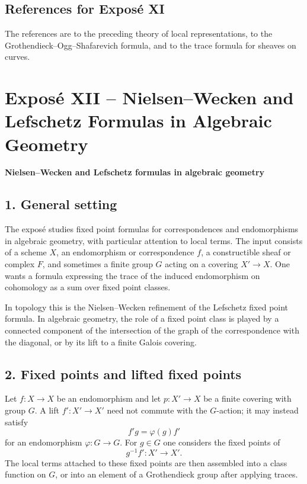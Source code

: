 \documentclass[11pt]{article}
\theoremstyle{plain}
\theoremstyle{definition}
\theoremstyle{remark}
\begin{document}
\subsection*{References for Expos\'e XI}

The references are to the preceding theory of local representations, to the Grothendieck--Ogg--Shafarevich formula, and to the trace formula for sheaves on curves.

\newpage

\section*{Expos\'e XII -- Nielsen--Wecken and Lefschetz Formulas in Algebraic Geometry}

\begin{center}
\textbf{Nielsen--Wecken and Lefschetz formulas in algebraic geometry}
\end{center}

\subsection*{1. General setting}

The expos\'e studies fixed point formulas for correspondences and endomorphisms in algebraic geometry, with particular attention to local terms. The input consists of a scheme $X$, an endomorphism or correspondence $f$, a constructible sheaf or complex $F$, and sometimes a finite group $G$ acting on a covering $X'\to X$. One wants a formula expressing the trace of the induced endomorphism on cohomology as a sum over fixed point classes.

In topology this is the Nielsen--Wecken refinement of the Lefschetz fixed point formula. In algebraic geometry, the role of a fixed point class is played by a connected component of the intersection of the graph of the correspondence with the diagonal, or by its lift to a finite Galois covering.

\subsection*{2. Fixed points and lifted fixed points}

Let $f:X\to X$ be an endomorphism and let $p:X'\to X$ be a finite covering with group $G$. A lift $f':X'\to X'$ need not commute with the $G$-action; it may instead satisfy
\[
   f' g = \varphi(g) f'
\]
for an endomorphism $\varphi:G\to G$. For $g\in G$ one considers the fixed points of
\[
   g^{-1}f':X'\to X'.
\]
The local terms attached to these fixed points are then assembled into a class function on $G$, or into an element of a Grothendieck group after applying traces.
\end{document}
